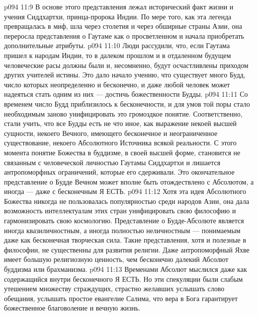 \vs p094 11:9 \pc {}\bibnobreakspace {} В основе этого представления лежал исторический факт жизни и учения Сиддхартхи, принца\hyp{}пророка Индии. По мере того, как эта легенда превращалась в миф, шла через столетия и через обширные страны Азии, она переросла представления о Гаутаме как о просветленном и начала приобретать дополнительные атрибуты.
\vs p094 11:10 \pc {}\bibnobreakspace {} Люди рассудили, что, если Гаутама пришел к народам Индии, то в далеком прошлом и в отдаленном будущем человеческие расы должны были и, несомненно, будут осчастливлены приходом других учителей истины. Это дало начало учению, что существует много Будд, число которых неопределенно и бесконечно, и даже любой человек может надеяться стать одним из них --- достичь божественности Будды.
\vs p094 11:11 \pc {}\bibnobreakspace {}  Со временем число Будд приблизилось к бесконечности, и для умов той поры стало необходимым заново унифицировать это громоздкое понятие. Соответственно, стали учить, что все Будды есть не что иное, как выражение некоей высшей сущности, некоего Вечного, имеющего бесконечное и неограниченное существование, некоего Абсолютного Источника всякой реальности. С этого момента понятие Божества в буддизме, в своей высшей форме, становится не связанным с человеческой личностью Гаутамы Сиддхартхи и лишается антропоморфных ограничений, которые его сдерживали. Это окончательное представление о Будде Вечном может вполне быть отождествлено с Абсолютом, а иногда --- даже с бесконечным Я ЕСТЬ.
\vs p094 11:12 \pc Хотя эта идея Абсолютного Божества никогда не пользовалась популярностью среди народов Азии, она дала возможность интеллектуалам этих стран унифицировать свою философию и гармонизировать свою космологию. Представление о Будде\hyp{}Абсолюте является иногда квазиличностным, а иногда полностью неличностным --- понимаемым даже как бесконечная творческая сила. Такие представления, хотя и полезные в философии, не существенны для развития религии. Даже антропоморфный Яхве имеет большую религиозную ценность, чем бесконечно далекий Абсолют буддизма или брахманизма.
\vs p094 11:13 Временами Абсолют мыслился даже как содержащийся внутри бесконечного Я ЕСТЬ. Но эти спекуляции были слабым утешением множеству страждущих, страстно желавших услышать слово обещания, услышать простое евангелие Салима, что вера в Бога гарантирует божественное благоволение и вечную жизнь.
